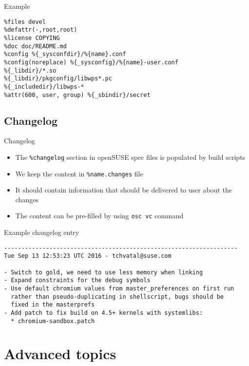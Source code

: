 \documentclass{beamer}
\begin{document}
\begin{frame}[fragile]{Example}
	\begin{small}
\begin{verbatim}
%files devel
%defattr(-,root,root)
%license COPYING
%doc doc/README.md
%config %{_sysconfdir}/%{name}.conf
%config(noreplace) %{_sysconfig}/%{name}-user.conf
%{_libdir}/*.so
%{_libdir}/pkgconfig/libwps*.pc
%{_includedir}/libwps-*
%attr(600, user, group) %{_sbindir}/secret
\end{verbatim}
	\end{small}
\end{frame}

\subsection{Changelog}

\begin{frame}[t]{Changelog}
	\begin{itemize}
	\item The \texttt{\%changelog} section in openSUSE spec files is populated by build scripts
	\item We keep the content in \texttt{\%{name}.changes} file
    \item It should contain information that should be delivered to user about the changes
    \item The content can be pre-filled by using \texttt{osc vc} command
	\end{itemize}
\end{frame}

\begin{frame}[fragile]{Example changelog entry}
	\begin{scriptsize}
\begin{verbatim}
-------------------------------------------------------------------
Tue Sep 13 12:53:23 UTC 2016 - tchvatal@suse.com

- Switch to gold, we need to use less memory when linking
- Expand constraints for the debug symbols
- Use default chromium values from master_preferences on first run
  rather than pseudo-duplicating in shellscript, bugs should be
  fixed in the masterprefs
- Add patch to fix build on 4.5+ kernels with systemlibs:
  * chromium-sandbox.patch

\end{verbatim}
	\end{scriptsize}
\end{frame}


\section{Advanced topics}
\end{document}
